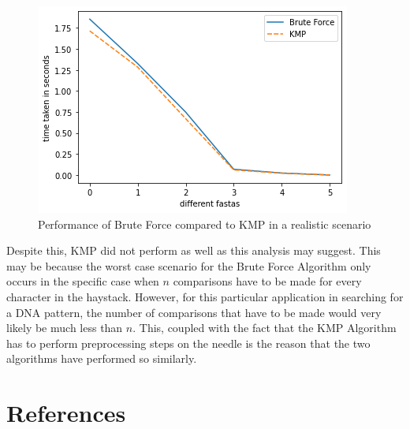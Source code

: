 \begin{figure}[H]
    \centering
    \begin{minipage}[b]{0.49\textwidth}
    \includegraphics[width=\textwidth]{images/graph.png}
    \caption{Performance of Brute Force compared to KMP in a realistic scenario}
    \label{fig:graph}
  \end{minipage}
\end{figure}

\noindent
Despite this, KMP did not perform as well as this analysis may suggest. This may be because the worst case scenario for the Brute Force Algorithm only occurs in the specific case when $n$ comparisons have to be made for every character in the haystack. However, for this particular application in searching for a DNA pattern, the number of comparisons that have to be made would very likely be much less than $n$. This, coupled with the fact that the KMP Algorithm has to perform preprocessing steps on the needle is the reason that the two algorithms have performed so similarly. 


\nocite{geeksforgeeks_kmp}
\nocite{wikipedia_2020}
\nocite{geeksforgeeks_bf}

\section*{References}

\renewcommand\bibname{}
\printbibliography

